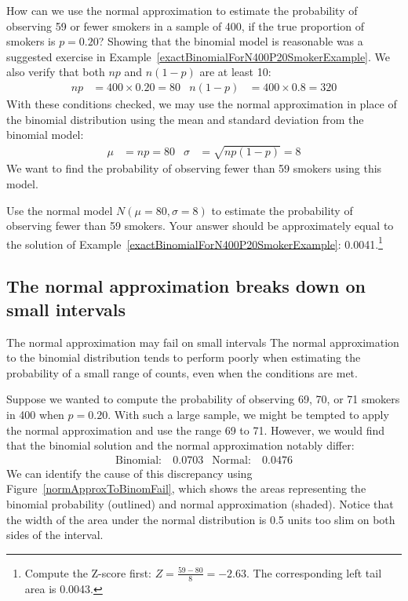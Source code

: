 \begin{example}{How can we use the normal approximation to estimate the probability of observing 59 or fewer smokers in a sample of 400, if the true proportion of smokers is $p=0.20$?} \label{approxBinomialForN400P20SmokerExample}
Showing that the binomial model is reasonable was a suggested exercise in Example~\ref{exactBinomialForN400P20SmokerExample}. We also verify that both $np$ and $n(1-p)$ are at least 10:
\begin{align*}
np&=400\times 0.20=80
&n(1-p)&=400\times 0.8=320
\end{align*}
With these conditions checked, we may use the normal approximation in place of the binomial distribution using the mean and standard deviation from the binomial model:
\begin{align*}
\mu &= np = 80
&\sigma &= \sqrt{np(1-p)} = 8
\end{align*}
We want to find the probability of observing fewer than 59 smokers using this model.
\end{example}

\begin{exercise}
Use the normal model $N(\mu=80, \sigma=8)$ to estimate the probability of observing fewer than 59 smokers. Your answer should be approximately equal to the solution of Example~\ref{exactBinomialForN400P20SmokerExample}: 0.0041.\footnote{Compute the Z-score first: $Z=\frac{59 - 80}{8} = -2.63$. The corresponding left tail area is 0.0043.}
\end{exercise}


\subsection{The normal approximation breaks down on small intervals}

\begin{caution}
{The normal approximation may fail on small intervals}
{The normal approximation to the binomial distribution tends to perform poorly when estimating the probability of a small range of counts, even when the conditions are met.}
\end{caution}

Suppose we wanted to compute the probability of observing 69, 70, or 71 smokers in 400 when $p=0.20$. With such a large sample, we might be tempted to apply the normal approximation and use the range 69 to 71. However, we would find that the binomial solution and the normal approximation notably differ:
\begin{align*}
\text{Binomial:}&\ 0.0703
&\text{Normal:}&\ 0.0476
\end{align*}
We can identify the cause of this discrepancy using Figure~\ref{normApproxToBinomFail}, which shows the areas representing the binomial probability (outlined) and normal approximation (shaded). Notice that the width of the area under the normal distribution is 0.5 units too slim on both sides of the interval.

